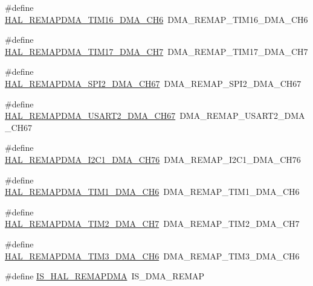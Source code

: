 \begin{DoxyCompactItemize}
\item 
\#define \hyperlink{group___h_a_l___d_m_a___aliased___defines_ga982538686481944a0bb7277321303bee}{H\+A\+L\+\_\+\+R\+E\+M\+A\+P\+D\+M\+A\+\_\+\+T\+I\+M16\+\_\+\+D\+M\+A\+\_\+\+C\+H6}~D\+M\+A\+\_\+\+R\+E\+M\+A\+P\+\_\+\+T\+I\+M16\+\_\+\+D\+M\+A\+\_\+\+C\+H6
\item 
\#define \hyperlink{group___h_a_l___d_m_a___aliased___defines_ga5ff091f7f81537b41fe4bac1d0f7918b}{H\+A\+L\+\_\+\+R\+E\+M\+A\+P\+D\+M\+A\+\_\+\+T\+I\+M17\+\_\+\+D\+M\+A\+\_\+\+C\+H7}~D\+M\+A\+\_\+\+R\+E\+M\+A\+P\+\_\+\+T\+I\+M17\+\_\+\+D\+M\+A\+\_\+\+C\+H7
\item 
\#define \hyperlink{group___h_a_l___d_m_a___aliased___defines_ga6376d9fb648c5df3bbd41746b98cb986}{H\+A\+L\+\_\+\+R\+E\+M\+A\+P\+D\+M\+A\+\_\+\+S\+P\+I2\+\_\+\+D\+M\+A\+\_\+\+C\+H67}~D\+M\+A\+\_\+\+R\+E\+M\+A\+P\+\_\+\+S\+P\+I2\+\_\+\+D\+M\+A\+\_\+\+C\+H67
\item 
\#define \hyperlink{group___h_a_l___d_m_a___aliased___defines_gad932cab9ecf9c8d136b8421d8506a270}{H\+A\+L\+\_\+\+R\+E\+M\+A\+P\+D\+M\+A\+\_\+\+U\+S\+A\+R\+T2\+\_\+\+D\+M\+A\+\_\+\+C\+H67}~D\+M\+A\+\_\+\+R\+E\+M\+A\+P\+\_\+\+U\+S\+A\+R\+T2\+\_\+\+D\+M\+A\+\_\+\+C\+H67
\item 
\#define \hyperlink{group___h_a_l___d_m_a___aliased___defines_gac6bff9249f33d8a00757b024f7a14487}{H\+A\+L\+\_\+\+R\+E\+M\+A\+P\+D\+M\+A\+\_\+\+I2\+C1\+\_\+\+D\+M\+A\+\_\+\+C\+H76}~D\+M\+A\+\_\+\+R\+E\+M\+A\+P\+\_\+\+I2\+C1\+\_\+\+D\+M\+A\+\_\+\+C\+H76
\item 
\#define \hyperlink{group___h_a_l___d_m_a___aliased___defines_ga60ba973bcc155520e8b58deb73948d80}{H\+A\+L\+\_\+\+R\+E\+M\+A\+P\+D\+M\+A\+\_\+\+T\+I\+M1\+\_\+\+D\+M\+A\+\_\+\+C\+H6}~D\+M\+A\+\_\+\+R\+E\+M\+A\+P\+\_\+\+T\+I\+M1\+\_\+\+D\+M\+A\+\_\+\+C\+H6
\item 
\#define \hyperlink{group___h_a_l___d_m_a___aliased___defines_gac2e00fc0ee4dd4d3ffdbdae32d211a35}{H\+A\+L\+\_\+\+R\+E\+M\+A\+P\+D\+M\+A\+\_\+\+T\+I\+M2\+\_\+\+D\+M\+A\+\_\+\+C\+H7}~D\+M\+A\+\_\+\+R\+E\+M\+A\+P\+\_\+\+T\+I\+M2\+\_\+\+D\+M\+A\+\_\+\+C\+H7
\item 
\#define \hyperlink{group___h_a_l___d_m_a___aliased___defines_ga1159405ec3b5377790d12238aa48007e}{H\+A\+L\+\_\+\+R\+E\+M\+A\+P\+D\+M\+A\+\_\+\+T\+I\+M3\+\_\+\+D\+M\+A\+\_\+\+C\+H6}~D\+M\+A\+\_\+\+R\+E\+M\+A\+P\+\_\+\+T\+I\+M3\+\_\+\+D\+M\+A\+\_\+\+C\+H6
\item 
\#define \hyperlink{group___h_a_l___d_m_a___aliased___defines_gac6b3f25c675802ffa4bcabdd78a878b9}{I\+S\+\_\+\+H\+A\+L\+\_\+\+R\+E\+M\+A\+P\+D\+MA}~I\+S\+\_\+\+D\+M\+A\+\_\+\+R\+E\+M\+AP

\end{DoxyCompactItemize}
